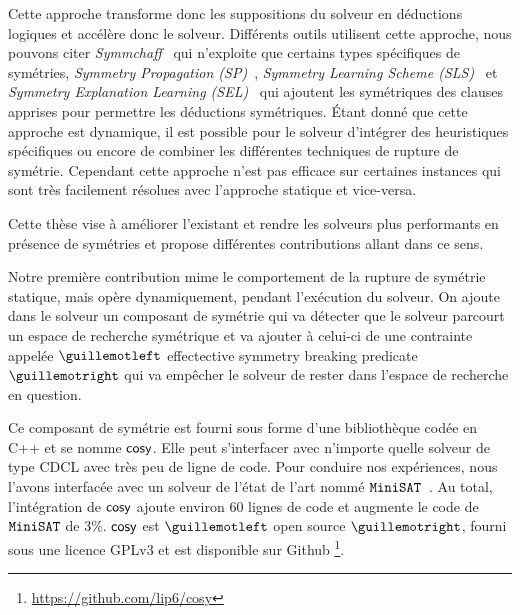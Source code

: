 Cette approche transforme donc les suppositions du solveur en déductions logiques et accélère donc le solveur.
Différents outils utilisent cette approche, nous pouvons citer \textit{Symmchaff}~\cite{sabharwal2005symchaff}
qui n'exploite que certains types spécifiques de symétries, \textit{Symmetry Propagation (SP)}~\cite{Devriendt12}, \textit{Symmetry Learning Scheme (SLS)}~\cite{benhamou2010enhancing} et \textit{Symmetry Explanation Learning (SEL)}~\cite{devriendt2017symmetric} qui ajoutent les symétriques des clauses apprises pour permettre les déductions symétriques.
Étant donné que cette approche est dynamique, il est possible pour le solveur 
d'intégrer des heuristiques spécifiques ou encore de combiner les différentes techniques de rupture de symétrie.
Cependant cette approche n'est pas efficace sur certaines instances qui sont très facilement résolues avec l'approche statique
et vice-versa.

Cette thèse vise à améliorer l'existant et rendre les solveurs plus performants en présence de symétries et
propose différentes contributions allant dans ce sens.  

Notre première contribution mime le comportement de la rupture de symétrie statique, mais 
opère dynamiquement, pendant l'exécution du solveur. On ajoute dans le solveur un composant de symétrie
qui va détecter que le solveur parcourt un espace de recherche symétrique et va ajouter à celui-ci de une contrainte appelée $\guillemotleft$ effectective symmetry breaking predicate $\guillemotright$ qui va empêcher le solveur de rester dans
l'espace de recherche en question. 

Ce composant de symétrie est fourni sous forme d'une bibliothèque codée en C++ et se nomme $\textsf{cosy}$.
Elle peut s'interfacer avec n'importe quelle solveur de type CDCL avec très peu de ligne de code. 
Pour conduire nos expériences, nous l'avons interfacée avec un solveur de l'état de l'art nommé $\texttt{MiniSAT}$~\cite{een2003extensible}. Au total, l'intégration de $\textsf{cosy}$ ajoute environ 60 lignes de code 
et augmente le code de $\texttt{MiniSAT}$ de 3\%.
$\textsf{cosy}$ est $\guillemotleft$ open source $\guillemotright$, fourni sous une licence GPLv3 et est disponible sur Github \footnote{\url{https://github.com/lip6/cosy}}.


